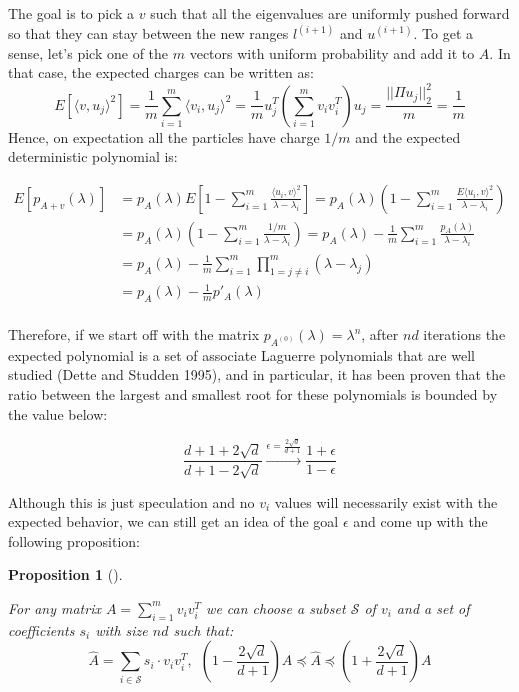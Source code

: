 \documentclass[
  letterpaper,
  DIV=11,
  numbers=noendperiod]{scrartcl}
\theoremstyle{plain}
\newtheorem{proposition}{Proposition}[section]
\theoremstyle{plain}
\theoremstyle{plain}
\theoremstyle{definition}
\theoremstyle{remark}
\begin{document}
The goal is to pick a \(v\) such that all the eigenvalues are uniformly
pushed forward so that they can stay between the new ranges
\(l^{(i+1)}\) and \(u^{(i+1)}\). To get a sense, let's pick one of the
\(m\) vectors with uniform probability and add it to \(A\). In that
case, the expected charges can be written as:
\[E[\langle v, u_j \rangle^2] = \frac{1}{m} \sum_{i=1}^m \langle v_i, u_j \rangle^2 = \frac{1}{m} u_j^T \left( \sum_{i=1}^m v_i v_i^T \right)u_j = \frac{||\Pi u_j||_2^2}{m} = \frac{1}{m}\]
Hence, on expectation all the particles have charge \(1/m\) and the
expected deterministic polynomial is:

\begin{align*}
E[p_{A + v}(\lambda)] &= p_A(\lambda) E\left[1 - \sum_{i=1}^m \frac{\langle u_i, v\rangle^2}{\lambda - \lambda_i}\right] = p_A(\lambda) \left(1 - \sum_{i=1}^m \frac{E\langle u_i, v\rangle^2}{\lambda - \lambda_i}\right)\\
& = p_A(\lambda) \left(1 - \sum_{i=1}^m \frac{1/m}{\lambda - \lambda_i}\right) = p_A(\lambda) - \frac{1}{m} \sum_{i=1}^m \frac{p_A(\lambda)}{\lambda - \lambda_i}\\
& = p_A(\lambda) - \frac{1}{m} \sum_{i=1}^m \prod_{1 = j\neq i}^m (\lambda - \lambda_j)\\
&= p_A(\lambda) - \frac{1}{m} p'_A(\lambda)\\
\end{align*}

Therefore, if we start off with the matrix
\(p_{A^{(0)}}(\lambda) = \lambda^n\), after \(nd\) iterations the
expected polynomial is a set of associate Laguerre polynomials that are
well studied (Dette and Studden 1995), and in particular, it has been
proven that the ratio between the largest and smallest root for these
polynomials is bounded by the value below:

\[\frac{d + 1 + 2\sqrt{d}}{d + 1 - 2\sqrt{d}} \xrightarrow{\epsilon = \frac{2\sqrt{d}}{d+1}} \frac{1 + \epsilon
}{1 - \epsilon}\]

Although this is just speculation and no \(v_i\) values will necessarily
exist with the expected behavior, we can still get an idea of the goal
\(\epsilon\) and come up with the following proposition:

\leavevmode{}%
\begin{proposition}[]\label{prp-final-form}

For any matrix \(A = \sum_{i=1}^m v_i v_i^T\) we can choose a subset
\(\mathcal{S}\) of \(v_i\) and a set of coefficients \(s_i\) with size
\(nd\) such that:
\[\hat{A} = \sum_{i \in \mathcal{S}} s_i \cdot v_i v_i^T,~~ (1 - \frac{2\sqrt{d}}{d+1}) A \preceq \hat{A} \preceq (1 + \frac{2\sqrt{d}}{d+1}) A\]

\end{proposition}
\end{document}

